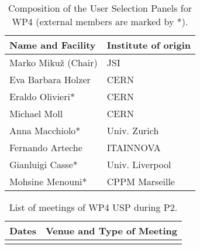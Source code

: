 \begin{table}[H]
\caption{Composition of the User Selection Panels for WP4 (external members are marked by *).}
\centering
\begin{tabular}{|L{0.4\textwidth}|C{0.6\textwidth}|} \hline
    {\bf Name and Facility} & {\bf Institute of origin} \\ \hline
    Marko Mikuž (Chair)	& JSI \\ \hline
    Eva Barbara Holzer	& CERN \\ \hline
    Eraldo Olivieri*	& CERN \\ \hline
    Michael Moll	& CERN \\ \hline
    Anna Macchiolo*	& Univ. Zurich \\ \hline
    Fernando Arteche & 	ITAINNOVA \\ \hline
    Gianluigi Casse* &	Univ. Liverpool \\ \hline
    Mohsine Menouni*& 	CPPM Marseille \\ \hline
\end{tabular}
\label{tab:usp-wp4}
\end{table}

\begin{table}[H]
\caption{List of meetings of WP4 USP during P2.}
\centering
\begin{tabular}{|L{0.2\textwidth}|C{0.8\textwidth}|} \hline
    {\bf Dates} & {\bf Venue and Type of Meeting} \\ \hline
     & \\ \hline 
\end{tabular}
\label{tab:usp-wp4-meet}
\end{table}